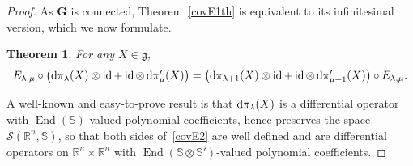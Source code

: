 \documentclass[10pt,a4paper]{amsart}
\DeclareMathOperator{\End}{End}
\DeclareMathOperator{\id}{id}
\numberwithin{equation}{section}
\newtheorem{theor}{Theorem}[section]
\begin{document}
\begin{proof}
As $\mathbf G$ is connected, Theorem~\ref{covE1th} is equivalent to its infinitesimal version, which we now formulate.

\begin{theor}\label{thcovE2}
 For any $X\in \mathfrak g$,
\begin{gather}\label{covE2}
E_{\lambda, \mu} \circ \big({{\rm d}}\pi_\lambda(X)\otimes \id+\id\otimes\, {{\rm d}}\pi'_\mu(X)\big)= \big({{\rm d}}\pi_{\lambda+1}(X)\otimes \id+\id\otimes\, {{\rm d}}\pi'_{\mu+1}(X)\big)\circ E_{\lambda, \mu}.
\end{gather}
\end{theor}
A well-known and easy-to-prove result is that ${{\rm d}}\pi_\lambda(X)$ is a differential operator with $\End(\mathbb S)$-valued polynomial coefficients, hence preserves the space $\mathcal S(\mathbb R^n, \mathbb S)$, so that both sides of~\eqref{covE2} are well defined and are differential operators on $\mathbb R^n\times \mathbb R^n$ with $\End(\mathbb S \otimes \mathbb S')$-valued polynomial coefficients.


\end{proof}
\end{document}

